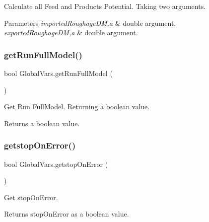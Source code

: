 Calculate all Feed and Products Potential. Taking two arguments. 


\begin{DoxyParams}{Parameters}
{\em imported\+Roughage\+DM,a} & double argument. \\
\hline
{\em exported\+Roughage\+DM,a} & double argument. \\
\hline
\end{DoxyParams}
\mbox{\label{class_global_vars_a62e98fc98cd491dedbd0e83db9584da2}} 
\subsubsection{\texorpdfstring{getRunFullModel()}{getRunFullModel()}}
{\footnotesize\ttfamily bool Global\+Vars.\+get\+Run\+Full\+Model (\begin{DoxyParamCaption}{ }\end{DoxyParamCaption})\hspace{0.3cm}{\ttfamily [inline]}}



Get Run Full\+Model. Returning a boolean value. 

\begin{DoxyReturn}{Returns}
a boolean value. 
\end{DoxyReturn}
\mbox{\label{class_global_vars_af818a48cc2a3646bfdf81ce83d256c75}} 
\subsubsection{\texorpdfstring{getstopOnError()}{getstopOnError()}}
{\footnotesize\ttfamily bool Global\+Vars.\+getstop\+On\+Error (\begin{DoxyParamCaption}{ }\end{DoxyParamCaption})\hspace{0.3cm}{\ttfamily [inline]}}



Get stop\+On\+Error. 

\begin{DoxyReturn}{Returns}
stop\+On\+Error as a boolean value. 
\end{DoxyReturn}
\mbox{\label{class_global_vars_a0fc8e12399cf9407f2d87a416491f97f}} 
